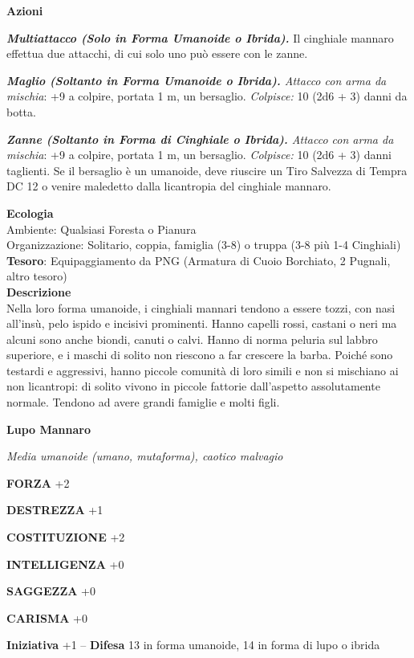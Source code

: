 \begin{multicols}{2}
\textbf{Azioni}

\textit{\textbf{Multiattacco (Solo in Forma Umanoide o Ibrida).}} Il cinghiale mannaro effettua due attacchi, di cui solo uno può essere con le zanne.

\textit{\textbf{Maglio (Soltanto in Forma Umanoide o Ibrida).} Attacco con arma da mischia}: +9 a colpire, portata 1 m, un bersaglio. \textit{Colpisce:} 10 (2d6 + 3) danni da botta.

\textit{\textbf{Zanne (Soltanto in Forma di Cinghiale o Ibrida).} Attacco con arma da mischia}: +9 a colpire, portata 1 m, un bersaglio. \textit{Colpisce:} 10 (2d6 + 3) danni taglienti. Se il bersaglio è un umanoide, deve riuscire un Tiro Salvezza di Tempra DC 12 o venire maledetto dalla licantropia del cinghiale mannaro.

\textbf{Ecologia}\\
Ambiente: Qualsiasi Foresta o Pianura\\
Organizzazione: Solitario, coppia, famiglia (3-8) o truppa (3-8 più 1-4 Cinghiali)\\
\textbf{Tesoro}: Equipaggiamento da PNG (Armatura di Cuoio Borchiato, 2 Pugnali, altro tesoro)\\
\textbf{Descrizione}\\
Nella loro forma umanoide, i cinghiali mannari tendono a essere tozzi, con nasi all'insù, pelo ispido e incisivi prominenti. Hanno capelli rossi, castani o neri ma alcuni sono anche biondi, canuti o calvi. Hanno di norma peluria sul labbro superiore, e i maschi di solito non riescono a far crescere la barba. Poiché sono testardi e aggressivi, hanno piccole comunità di loro simili e non si mischiano ai non licantropi: di solito vivono in piccole fattorie dall'aspetto assolutamente normale. Tendono ad avere grandi famiglie e molti figli.


\medskip{}\textbf{Lupo Mannaro}

\textit{Media umanoide (umano, mutaforma), caotico malvagio}

\textbf{FORZA} +2

\textbf{DESTREZZA} +1

\textbf{COSTITUZIONE} +2

\textbf{INTELLIGENZA} +0

\textbf{SAGGEZZA} +0

\textbf{CARISMA} +0

\textbf{Iniziativa} +1 -- \textbf{Difesa} 13 in forma umanoide, 14 in forma di lupo o ibrida


\end{multicols}
